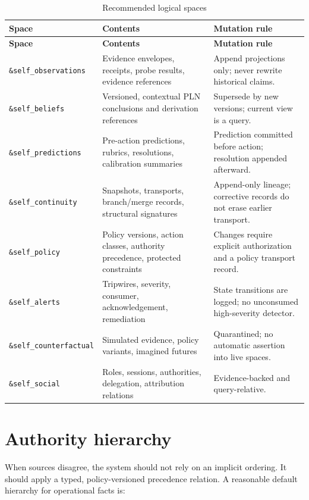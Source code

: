 \documentclass[11pt,oneside]{report}
\begin{document}
\begin{longtable}{@{}L{1.60in}L{1.75in}L{3.10in}@{}}
\caption{Recommended logical spaces}\label{tab:spaces}\\
\toprule
\textbf{Space} & \textbf{Contents} & \textbf{Mutation rule} \\
\midrule
\endfirsthead
\toprule
\textbf{Space} & \textbf{Contents} & \textbf{Mutation rule} \\
\midrule
\endhead
\texttt{\&self\_observations} & Evidence envelopes, receipts, probe results, evidence references & Append projections only; never rewrite historical claims. \\
\texttt{\&self\_beliefs} & Versioned, contextual PLN conclusions and derivation references & Supersede by new versions; current view is a query. \\
\texttt{\&self\_predictions} & Pre-action predictions, rubrics, resolutions, calibration summaries & Prediction committed before action; resolution appended afterward. \\
\texttt{\&self\_continuity} & Snapshots, transports, branch/merge records, structural signatures & Append-only lineage; corrective records do not erase earlier transport. \\
\texttt{\&self\_policy} & Policy versions, action classes, authority precedence, protected constraints & Changes require explicit authorization and a policy transport record. \\
\texttt{\&self\_alerts} & Tripwires, severity, consumer, acknowledgement, remediation & State transitions are logged; no unconsumed high-severity detector. \\
\texttt{\&self\_counterfactual} & Simulated evidence, policy variants, imagined futures & Quarantined; no automatic assertion into live spaces. \\
\texttt{\&self\_social} & Roles, sessions, authorities, delegation, attribution relations & Evidence-backed and query-relative. \\
\bottomrule
\end{longtable}

\section{Authority hierarchy}

When sources disagree, the system should not rely on an implicit ordering. It should apply a typed, policy-versioned precedence relation. A reasonable default hierarchy for operational facts is:
\end{document}
